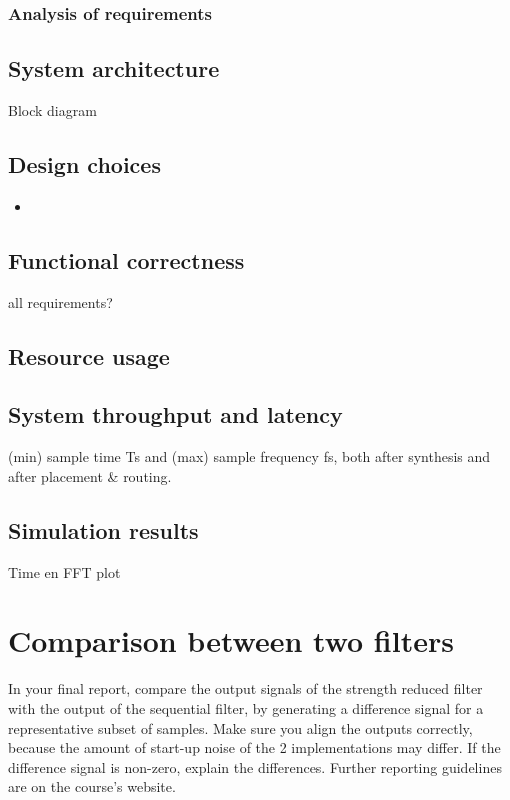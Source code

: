 \documentclass[a4paper,twoside,11pt, fleqn]{article}
\begin{document}
\subsubsection{Analysis of requirements}


\subsection{System architecture}
Block diagram
\subsection{Design choices}
\begin{itemize}
	\item 
\end{itemize}


\subsection{Functional correctness}
all requirements?

\subsection{Resource usage}


\subsection{System throughput and latency}
 (min) sample time Ts and (max) sample
frequency fs, both after synthesis and after placement \& routing.

\subsection{Simulation results}
Time en FFT plot

\newpage
\section{Comparison between two filters}
In your final report, compare the output signals of the strength reduced filter with the output of the sequential filter, by generating a difference signal for a representative subset of
samples. Make sure you align the outputs correctly, because the amount of start-up noise of
the 2 implementations may differ. If the difference signal is non-zero, explain the differences.
Further reporting guidelines are on the course’s website.
\end{document}
